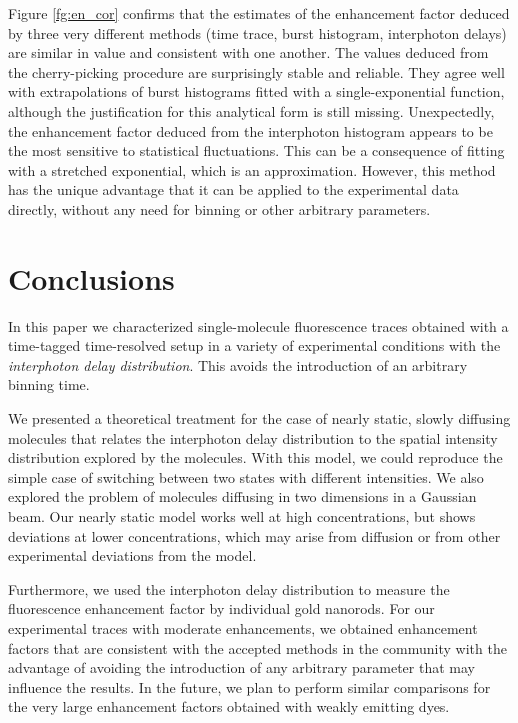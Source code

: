 %

Figure \ref{fg:en_cor} confirms that the estimates of the enhancement factor deduced by three very different methods (time trace, burst histogram, interphoton delays) are similar in value and consistent with one another. The values deduced from the cherry-picking procedure are surprisingly stable and reliable. They agree well with extrapolations of burst histograms fitted with a single-exponential function, although the justification for this analytical form is still missing. Unexpectedly, the enhancement factor deduced from the interphoton histogram appears to be the most sensitive to statistical fluctuations. This can be a consequence of fitting with a stretched exponential, which is an approximation. However, this method has the unique advantage that it can be applied to the experimental data directly, without any need for binning or other arbitrary parameters.


\section{Conclusions}

In this paper we characterized single-molecule fluorescence traces 
obtained with a time-tagged time-resolved setup in a variety of 
experimental conditions with the \textit{interphoton
delay distribution}. This avoids the introduction of an arbitrary binning time. 

We presented a theoretical treatment for the case of nearly static, slowly diffusing molecules that
relates the interphoton delay distribution to the spatial intensity 
distribution explored by the molecules. With this model, we could reproduce the simple case of 
switching between two states with different intensities. We also explored the problem of molecules diffusing in two dimensions in a Gaussian beam. Our nearly static model works well at high concentrations, but shows deviations at lower concentrations, which may arise from diffusion or from other experimental deviations from the model.

Furthermore, we used the interphoton delay distribution to measure the 
fluorescence enhancement factor by individual gold nanorods. For our experimental traces with moderate enhancements, we obtained
enhancement factors that are consistent with the accepted methods in the 
community with the advantage of avoiding the introduction of any arbitrary
parameter that may influence the results. 
In the future, we plan to perform similar comparisons for the very 
large enhancement factors obtained with weakly emitting dyes.
% 
